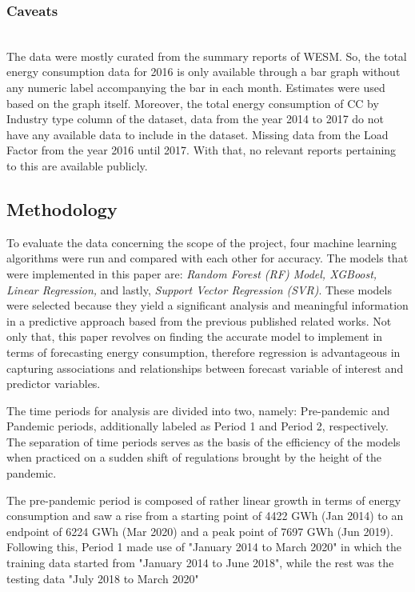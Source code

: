 \documentclass[runningheads]{llncs}
\begin{document}
\subsubsection{Caveats}~\\

The data were mostly curated from the summary reports of WESM. So, the total energy consumption data for 2016 is only available through a bar graph without any numeric label accompanying the bar in each month. Estimates were used based on the graph itself. Moreover, the total energy consumption of CC by Industry type column of the dataset, data from the year 2014 to 2017 do not have any available data to include in the dataset. Missing data from the Load Factor from the year 2016 until 2017. With that, no relevant reports pertaining to this are available publicly.

\subsection{Methodology}

To evaluate the data concerning the scope of the project, four machine learning algorithms were run and compared with each other for accuracy. The models that were implemented in this paper are: \textit{Random Forest (RF) Model, XGBoost, Linear Regression,} and lastly, \textit{Support Vector Regression (SVR)}. These models were selected because they yield a significant analysis and meaningful information in a predictive approach based from the previous published related works. Not only that, this paper revolves on finding the accurate model to implement in terms of forecasting energy consumption, therefore regression is advantageous in capturing associations and relationships between forecast variable of interest and predictor variables.

The time periods for analysis are divided into two, namely: Pre-pandemic and Pandemic periods, additionally labeled as Period 1 and Period 2, respectively. The separation of time periods serves as the basis of the efficiency of the models when practiced on a sudden shift of regulations brought by the height of the pandemic.

The pre-pandemic period is composed of rather linear growth in terms of energy consumption and saw a rise from a starting point of 4422 GWh (Jan 2014) to an endpoint of 6224 GWh (Mar 2020) and a peak point of 7697 GWh (Jun 2019). Following this, Period 1 made use of "January 2014 to March 2020" in which the training data started from "January 2014 to June 2018", while the rest was the testing data "July 2018 to March 2020"
\end{document}
